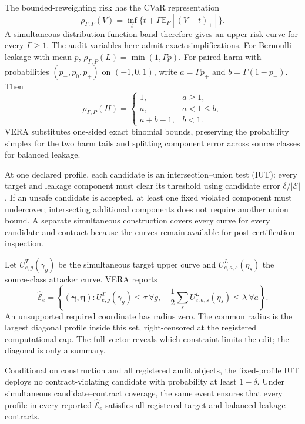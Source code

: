 The bounded-reweighting risk has the CVaR representation
\begin{equation}
\rho_{\Gamma,P}(V)=\inf_{t}
\{t+\Gamma\mathbb E_P[(V-t)_+]\}.
\label{iclr:eq:cvar}
\end{equation}
A simultaneous distribution-function band therefore gives an upper risk curve
for every $\Gamma\ge1$. The audit variables here admit exact simplifications.
For Bernoulli leakage with mean $p$,
$\rho_{\Gamma,P}(L)=\min(1,\Gamma p)$. For paired harm with probabilities
$(p_-,p_0,p_+)$ on $(-1,0,1)$, write $a=\Gamma p_+$ and
$b=\Gamma(1-p_-)$. Then
\begin{equation}
\rho_{\Gamma,P}(H)=
\begin{cases}
1,&a\ge1,\\
a,&a<1\le b,\\
a+b-1,&b<1.
\end{cases}
\label{iclr:eq:ternary}
\end{equation}
VERA substitutes one-sided exact binomial bounds, preserving the probability
simplex for the two harm tails and splitting component error across source
classes for balanced leakage.

At one declared profile, each candidate is an intersection--union test (IUT):
every target and leakage component must clear its threshold using candidate
error $\delta/|\mathcal E|$. If an unsafe candidate is accepted, at least one
fixed violated component must undercover; intersecting additional components
does not require another union bound. A separate simultaneous construction
covers every curve for every candidate and contract because the curves remain
available for post-certification inspection.

Let $U^T_{e,g}(\gamma_g)$ be the simultaneous target upper curve and
$U^L_{e,a,s}(\eta_s)$ the source-class attacker curve. VERA reports
\begin{equation}
\widehat{\mathcal E}_e=\left\{(\boldsymbol\gamma,\boldsymbol\eta):
U^T_{e,g}(\gamma_g)\le\tau\ \forall g,\quad
\frac12\sum_sU^L_{e,a,s}(\eta_s)\le\lambda\ \forall a\right\}.
\label{iclr:eq:envelope}
\end{equation}
An unsupported required coordinate has radius zero. The common radius is the
largest diagonal profile inside this set, right-censored at the registered
computational cap. The full vector reveals which constraint limits the edit;
the diagonal is only a summary.

\begin{theorem}
\label{iclr:thm:certificate}
Conditional on construction and all registered audit objects, the fixed-profile
IUT deploys no contract-violating candidate with probability at least
$1-\delta$. Under simultaneous candidate--contract coverage, the same event
ensures that every profile in every reported $\widehat{\mathcal E}_e$ satisfies all registered
target and balanced-leakage contracts.
\end{theorem}

